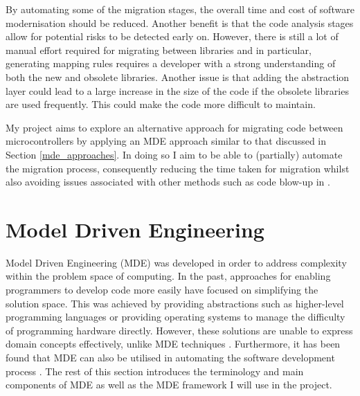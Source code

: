 \documentclass{UoYCSproject}
\begin{document}
By automating some of the migration stages, the overall time and cost of software modernisation should be reduced. Another benefit is that the code analysis stages allow for potential risks to be detected early on. However, there is still a lot of manual effort required for migrating between libraries and in particular, generating mapping rules requires a developer with a strong understanding of both the new and obsolete libraries. Another issue is that adding the abstraction layer could lead to a large increase in the size of the code if the obsolete libraries are used frequently. This could make the code more difficult to maintain.

My project aims to explore an alternative approach for migrating code between microcontrollers by applying an MDE approach similar to that discussed in Section \ref{mde_approaches}. In doing so I aim to be able to (partially) automate the migration process, consequently reducing the time taken for migration whilst also avoiding issues associated with other methods such as code blow-up in \parencite{gerasimou2017technical}.

\section{Model Driven Engineering} \label{mde_bg}
Model Driven Engineering (MDE) was developed in order to address complexity within the problem space of computing. In the past, approaches for enabling programmers to develop code more easily have focused on simplifying the solution space. This was achieved by providing abstractions such as higher-level programming languages or providing operating systems to manage the difficulty of programming hardware directly. However, these solutions are unable to express domain concepts effectively, unlike MDE techniques \parencite{schmidt2006model}. Furthermore, it has been found that MDE can also be utilised in automating the software development process \parencite{bezivin2004search}.
\newline
The rest of this section introduces the terminology and main components of MDE as well as the MDE framework I will use in the project.
\end{document}
